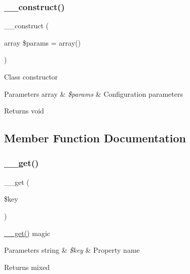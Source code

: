 \subsubsection{\texorpdfstring{\+\_\+\+\_\+construct()}{\_\_construct()}}
{\footnotesize\ttfamily \+\_\+\+\_\+construct (\begin{DoxyParamCaption}\item[{array}]{\$params = {\ttfamily array()} }\end{DoxyParamCaption})}

Class constructor


\begin{DoxyParams}[1]{Parameters}
array & {\em \$params} & Configuration parameters \\
\hline
\end{DoxyParams}
\begin{DoxyReturn}{Returns}
void 
\end{DoxyReturn}


\subsection{Member Function Documentation}
\mbox{\label{class_c_i___encryption_a4537dad3b44254124991341cc91b28fb}} 
\subsubsection{\texorpdfstring{\+\_\+\+\_\+get()}{\_\_get()}}
{\footnotesize\ttfamily \+\_\+\+\_\+get (\begin{DoxyParamCaption}\item[{}]{\$key }\end{DoxyParamCaption})}

\mbox{\hyperlink{class_c_i___encryption_a4537dad3b44254124991341cc91b28fb}{\+\_\+\+\_\+get()}} magic


\begin{DoxyParams}[1]{Parameters}
string & {\em \$key} & Property name \\
\hline
\end{DoxyParams}
\begin{DoxyReturn}{Returns}
mixed 
\end{DoxyReturn}
\mbox{\label{class_c_i___encryption_a2b585f447a6282e702dd3153baf3d68f}} 
